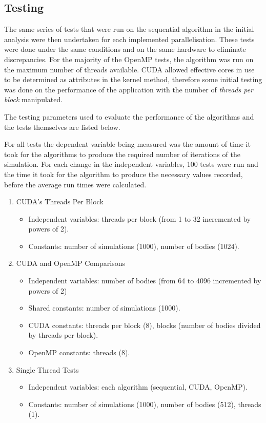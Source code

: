 \documentclass[12pt,journal,transmag]{IEEEtran}
\begin{document}
	\subsection{Testing}
	The same series of tests that were run on the sequential algorithm in the initial analysis were then undertaken for each implemented parallelisation. These tests were done under the same conditions and on the same hardware to eliminate discrepancies. For the majority of the OpenMP tests, the algorithm was run on the maximum number of threads available. CUDA allowed effective cores in use to be determined as attributes in the kernel method, therefore some initial testing was done on the performance of the application with the number of \textit{threads per block} manipulated.
	
	The testing parameters used to evaluate the performance of the algorithms and the tests themselves are listed below.
	
	For all tests the dependent variable being measured was the amount of time it took for the algorithms to produce the required number of iterations of the simulation. For each change in the independent variables, 100 tests were run and the time it took for the algorithm to produce the necessary values recorded, before the average run times were calculated. 
	
	\begin{enumerate}
		\item CUDA's Threads Per Block
		\begin{itemize}
			\item 	Independent variables: threads per block (from 1 to 32 incremented by powers of 2).
			\item 	Constants: number of simulations (1000), number of bodies (1024).
		\end{itemize}
		\item CUDA and OpenMP Comparisons
		\begin{itemize}
			\item 	Independent variables: number of bodies (from 64 to 4096 incremented by powers of 2)
			\item 	Shared constants: number of simulations (1000).
			\item	CUDA constants: threads per block (8), blocks (number of bodies divided by threads per block).
			\item OpenMP constants: threads (8).
		\end{itemize}
		\item Single Thread Tests
		\begin{itemize}
			\item 	Independent variables: each algorithm (sequential, CUDA, OpenMP).	
			\item 	Constants: number of simulations (1000), number of bodies (512), threads (1).
		\end{itemize}
	\end{enumerate}
	
\end{document}
